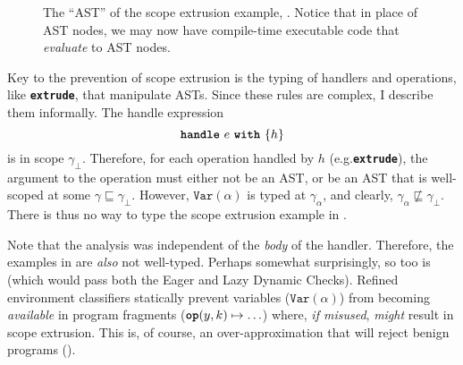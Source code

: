\begin{figure}

\caption{The ``AST'' of the scope extrusion example, . Notice that in place of AST nodes, we may now have compile-time executable code that \textit{evaluate} to AST nodes.}%
\label{fig:classifier-ast-scope-extrusion}
\end{figure}

Key to the prevention of scope extrusion is the typing of handlers and operations, like \textbf{\texttt{extrude}}, that manipulate ASTs. Since these rules are complex, I describe them informally. The handle expression
\[\textbf{\texttt{handle}} \,\, {e} \,\, \textbf{\texttt{with}} \,\, \{{h}\}\]
is in scope $\gamma_{\bot}$. Therefore, for each operation handled by $h$ (e.g.\textbf{\texttt{extrude}}), the argument to the operation must either not be an AST, or be an AST that is well-scoped at some $\gamma \sqsubseteq \gamma_{\bot}$. 
However, $\texttt{Var}(\alpha)$ is typed at $\gamma_{\alpha}$, and clearly, $\gamma_{\alpha} \not\sqsubseteq \gamma_{\bot}$. There is thus no way to type the scope extrusion example in .

Note that the analysis was independent of the \textit{body} of the handler. Therefore, the examples in  are \textit{also} not well-typed. Perhaps somewhat surprisingly, so too is  (which would pass both the Eager and Lazy Dynamic Checks). Refined environment classifiers statically prevent variables ($\texttt{Var}(\alpha)$) from becoming \textit{available} in program fragments ($\texttt{\textbf{op}}(y, k) \mapsto \ldots$) where, \textit{if misused}, \textit{might} result in scope extrusion. This is, of course, an over-approximation that will reject benign programs ().

